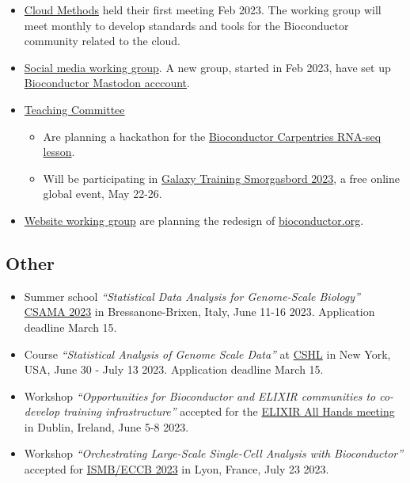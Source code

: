 \begin{itemize}
\item
  \href{https://workinggroups.bioconductor.org/currently-active-working-groups-committees.html\#cloud-methods}{Cloud Methods}
  held their first meeting Feb 2023. The working group will meet monthly to
  develop standards and tools for the Bioconductor community related to the
  cloud.
\item
  \href{https://workinggroups.bioconductor.org/currently-active-working-groups-committees.html\#social-media}{Social media working group}.
  A new group, started in Feb 2023, have set up
  \href{https://genomic.social/@bioconductor}{Bioconductor Mastodon acccount}.
\item
  \href{https://workinggroups.bioconductor.org/currently-active-working-groups-committees.html\#education}{Teaching Committee}

  \begin{itemize}
  \tightlist
  \item
    Are planning a hackathon for the
    \href{https://carpentries-incubator.github.io/bioc-rnaseq/}{Bioconductor Carpentries RNA-seq lesson}.
  \item
    Will be participating in
    \href{https://gallantries.github.io/video-library/events/smorgasbord3/}{Galaxy Training Smorgasbord 2023},
    a free online global event, May 22-26.
  \end{itemize}
\item
  \href{\%5Bhttps://workinggroups.bioconductor.org/currently-active-working-groups-committees.html\#website}{Website working group}
  are planning the redesign of \url{bioconductor.org}.
\end{itemize}

\hypertarget{other}{%
\subsection{Other}\label{other}}

\begin{itemize}
\tightlist
\item
  Summer school \emph{``Statistical Data Analysis for Genome-Scale Biology''} \href{https://csama2023.bioconductor.eu/}{CSAMA 2023} in Bressanone-Brixen, Italy, June 11-16 2023. Application deadline March 15.
\item
  Course \emph{``Statistical Analysis of Genome Scale Data''} at \href{https://meetings.cshl.edu/courses.aspx?course=C-DATA\&year=23}{CSHL} in New York, USA, June 30 - July 13 2023. Application deadline March 15.
\item
  Workshop \emph{``Opportunities for Bioconductor and ELIXIR communities to co-develop training infrastructure''} accepted for the \href{https://elixir-europe.org/events/elixir-all-hands-2023}{ELIXIR All Hands meeting} in Dublin, Ireland, June 5-8 2023.
\item
  Workshop \emph{``Orchestrating Large-Scale Single-Cell Analysis with Bioconductor''} accepted for \href{https://www.iscb.org/ismbeccb2023-programme/tutorials\#ip4}{ISMB/ECCB 2023} in Lyon, France, July 23 2023.
\end{itemize}

